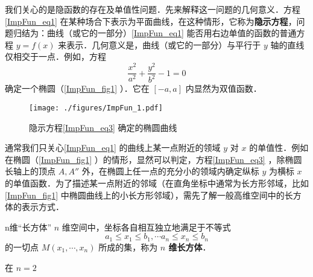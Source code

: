 我们关心的是隐函数的存在及单值性问题．先来解释这一问题的几何意义．方程\autoref{ImpFun_eq1} 在某种场合下表示为平面曲线，在这种情形，它称为\textbf{隐示方程}，问题归结为：曲线（或它的一部分）\autoref{ImpFun_eq1} 能否用右边单值的函数的普通方程 $y=f(x)$ 来表示．几何意义是，曲线（或它的一部分）与平行于 $y$ 轴的直线仅相交于一点．例如，方程 
\begin{equation}\label{ImpFun_eq3}
\frac{x^2}{a^2}+\frac{y^2}{b^2}-1=0
\end{equation}
确定一个椭圆（\autoref{ImpFun_fig1} ）．它在 $[-a,a]$ 内显然为双值函数．
\begin{figure}[ht]
\centering
\texttt{[image: ./figures/ImpFun\_1.pdf]}
\caption{隐示方程\autoref{ImpFun_eq3} 确定的椭圆曲线} \label{ImpFun_fig1}
\end{figure}
通常我们只关心\autoref{ImpFun_eq1} 的曲线上某一点附近的领域 $y$ 对 $x$ 的单值性．例如在椭圆（\autoref{ImpFun_fig1} ）的情形，显然可以判定，方程\autoref{ImpFun_eq3} ，除椭圆长轴上的顶点 $A,A''$ 外，在椭圆上任一点的充分小的领域内确定纵标 $y$ 为横标 $x$ 的单值函数．为了描述某一点附近的邻域（在直角坐标中通常为长方形邻域，比如\autoref{ImpFun_fig1} 中椭圆曲线上的小长方形邻域），需先了解一般高维空间中的长方体的表示方式．
\begin{definition}{n维“长方体”}
$n$ 维空间中，坐标各自相互独立地满足于不等式
\begin{equation}
a_1\leq x_1\leq b_1,\cdots a_n\leq x_n\leq b_n
\end{equation}
的一切点 $M(x_1,\cdots,x_n)$ 所成的集，称为\textbf{ $n$ 维长方体}．
\end{definition}
在 $n=2$ 